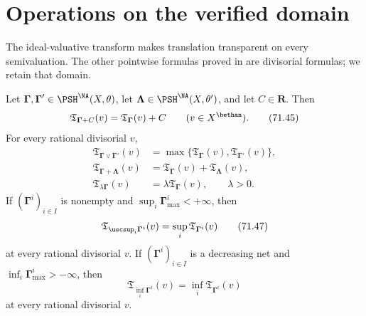 \section{Operations on the verified domain}
\label{sec:pseff-operations}

The ideal-valuative transform makes translation transparent on every
semivaluation.  The other pointwise formulas proved in
\cite{Xia23Operations} are divisorial formulas; we retain that domain.

\begin{proposition}\label{prop:pseff-operation-formulas}
Let \(\boldsymbol\Gamma,\boldsymbol\Gamma'\in
\PSH^{\NA}(X,\theta)\), let
\(\boldsymbol\Lambda\in\PSH^{\NA}(X,\theta')\), and let \(C\in\mathbf R\).
Then
\[
 \mathfrak T_{\boldsymbol\Gamma+C}(v)
 =\mathfrak T_{\boldsymbol\Gamma}(v)+C
 \qquad(v\in X^{\bethan}).
\tag{71.45}\label{eq:pseff-operation-translation}
\]
For every rational divisorial \(v\),
\[
 \begin{aligned}
 \mathfrak T_{\boldsymbol\Gamma\vee\boldsymbol\Gamma'}(v)
   &=\max\{\mathfrak T_{\boldsymbol\Gamma}(v),
            \mathfrak T_{\boldsymbol\Gamma'}(v)\},\\
 \mathfrak T_{\boldsymbol\Gamma+\boldsymbol\Lambda}(v)
   &=\mathfrak T_{\boldsymbol\Gamma}(v)
     +\mathfrak T_{\boldsymbol\Lambda}(v),\\
 \mathfrak T_{\lambda\boldsymbol\Gamma}(v)
   &=\lambda\mathfrak T_{\boldsymbol\Gamma}(v),
 \qquad \lambda>0.
 \end{aligned}
\tag{71.46}\label{eq:pseff-operation-algebra}
\]
If \((\boldsymbol\Gamma^i)_{i\in I}\) is nonempty and
\(\sup_i\boldsymbol\Gamma^i_{\max}<+\infty\), then
\[
 \mathfrak T_{\uscsup_i\boldsymbol\Gamma^i}(v)
 =\sup_i\mathfrak T_{\boldsymbol\Gamma^i}(v)
\tag{71.47}\label{eq:pseff-operation-supremum}
\]
at every rational divisorial \(v\).  If
\((\boldsymbol\Gamma^i)_{i\in I}\) is a decreasing net and
\(\inf_i\boldsymbol\Gamma^i_{\max}>-\infty\), then
\[
 \mathfrak T_{\inf_i\boldsymbol\Gamma^i}(v)
 =\inf_i\mathfrak T_{\boldsymbol\Gamma^i}(v)
\tag{71.48}\label{eq:pseff-operation-infimum}
\]
at every rational divisorial \(v\).
\end{proposition}

